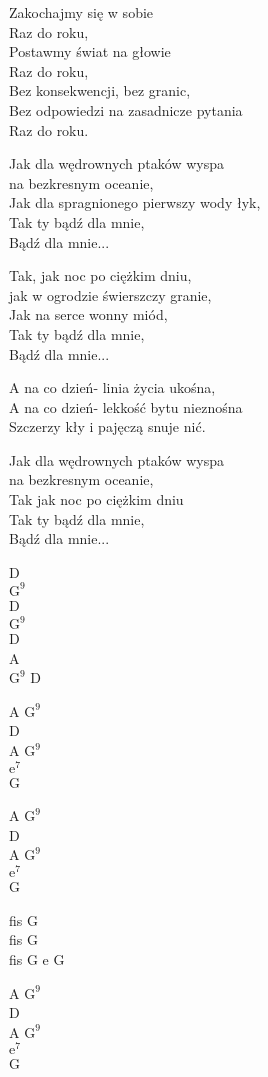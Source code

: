 \begin{text}
\vin Zakochajmy się w sobie\\
\vin Raz do roku, \\
\vin Postawmy świat na głowie\\
\vin Raz do roku, \\
\vin Bez konsekwencji, bez granic, \\
\vin Bez odpowiedzi na zasadnicze pytania\\
\vin Raz do roku. 

Jak dla wędrownych ptaków wyspa\\
na bezkresnym oceanie, \\
Jak dla spragnionego pierwszy wody łyk, \\
Tak ty bądź dla mnie, \\
Bądź dla mnie... 

Tak, jak noc po ciężkim dniu,\\
jak w ogrodzie świerszczy granie,\\
Jak na serce wonny miód,\\
Tak ty bądź dla mnie,\\
Bądź dla mnie...

A na co dzień- linia życia ukośna, \\
A na co dzień- lekkość bytu nieznośna \\
Szczerzy kły i pajęczą snuje nić. 

Jak dla wędrownych ptaków wyspa\\
na bezkresnym oceanie,\\
Tak jak noc po ciężkim dniu\\
Tak ty bądź dla mnie,\\
Bądź dla mnie...
\end{text}
\begin{chord}
    D\\
    $\mathrm{G^9}$\\
    D\\
    $\mathrm{G^9}$\\
    D\\
    A\\
    $\mathrm{G^9}$ D

    A $\mathrm{G^9}$\\
    D\\
    A $\mathrm{G^9}$\\
    $\mathrm{e^7}$\\
    G

A $\mathrm{G^9}$\\
D\\
A $\mathrm{G^9}$\\
$\mathrm{e^7}$\\
G

fis G\\
fis G\\
fis G e G

A $\mathrm{G^9}$\\
D\\
A $\mathrm{G^9}$\\
$\mathrm{e^7}$\\
G
\end{chord}
